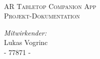 \documentclass[
11pt, %
oneside, %
ngerman, %
singlespacing, %
headsepline, %
]{MastersDoctoralThesis} %
\begin{document}
\frontmatter %

\pagestyle{plain} %


\begin{titlepage}
	\begin{center}

		\vspace*{.08\textheight}

		\HRule \\[0.6cm] %
		\textsc{\Large AR Tabletop Companion App}\\[0.5cm]
		\textsc{\huge Projekt-Dokumentation}\vspace{0.4cm}
		\HRule \\[1.5cm] %

		\vfill

		\emph{Mitwirkender:}\\[0.3cm]
		{Lukas Vogrinc}\\ %
		{- 77871 -}\\[0.2cm]


\end{center}
\end{titlepage}
\end{document}
